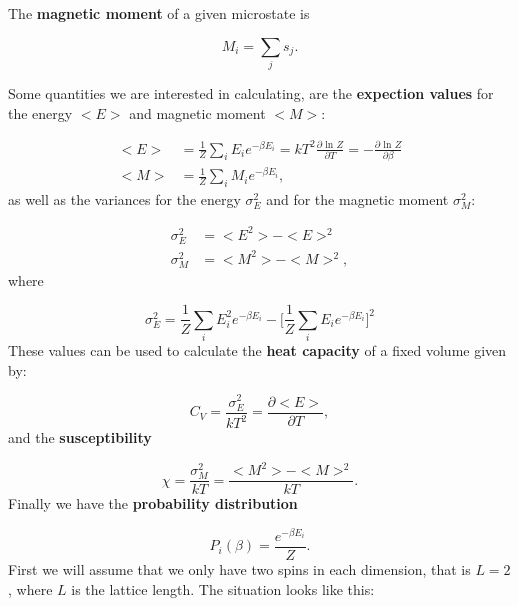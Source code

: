 \documentclass{article}
\begin{document}
\begin{multicols}{2}
The \textbf{magnetic moment} of a given microstate is

\begin{equation}\label{eq:magnetization}
	M_i = \sum_j s_j.
\end{equation} 

Some quantities we are interested in calculating, are the \textbf{expection values} for the energy $<E>$ and magnetic moment $<M>$:

\begin{equation}
\begin{aligned}
	<E> &= \frac{1}{Z} \sum_i E_i e^{- \beta E_i} = kT^2 \frac{\partial \textrm{ ln } Z}{\partial T} = - \frac{\partial \textrm{ ln } Z}{\partial \beta} \\
	<M> &= \frac{1}{Z} \sum_i M_i e^{- \beta E_i},
\end{aligned}
\end{equation}
as well as the variances for the energy $\sigma_E^2$ and for the magnetic moment $\sigma_M^2$:

\begin{equation}\label{eq:expect_values}
\begin{aligned}
	\sigma_E^2 &= <E^2> - <E>^2 \\
	\sigma_M^2 &= <M^2> - <M>^2,
\end{aligned}
\end{equation}
where

\begin{equation}
	\sigma_E^2 = \frac{1}{Z} \sum_i E_i^2 e^{- \beta E_i} - \bigg[ \frac{1}{Z} \sum_i E_i e^{- \beta E_i} \bigg]^2
\end{equation}
These values can be used to calculate the \textbf{heat capacity} of a fixed volume given by:

\begin{equation}
	C_V = \frac{\sigma_E^2}{kT^2} = \frac{\partial <E>}{\partial T},
\end{equation}
and the \textbf{susceptibility}

\begin{equation}
	\chi = \frac{\sigma_M^2}{kT} = \frac{<M^2> - <M>^2}{kT}.
\end{equation}
Finally we have the \textbf{probability distribution}

\begin{equation}
	P_i (\beta) = \frac{e^{-\beta E_i}}{Z}.
\end{equation}
First we will assume that we only have two spins in each dimension, that is $L = 2$, where $L$ is the lattice length. The situation looks like this:


\end{multicols}
\end{document}

